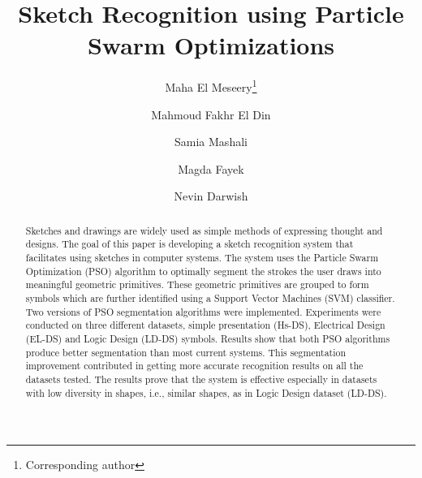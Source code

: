 \documentclass[preprint,10pt,5p,twocolumn]{elsarticle}
\begin{document}
\begin{frontmatter}
\title{Sketch Recognition using Particle Swarm Optimizations}


\author[ERI]{Maha El Meseery\footnote{Corresponding author}}
\author[ERI]{Mahmoud Fakhr El Din}
\author[ERI]{Samia Mashali}
\author[FAC]{Magda Fayek}
\author[FAC]{Nevin Darwish}
\address[ERI]{Signals Processing Group, Computers and Systems Department, 
  Electronic Research Institute, Cairo, Egypt\\melmeseery@eri.sci.eg, mafakhr@mcit.gov.eg, samia@eri.sci.eg}
\address[FAC]{Computer Engineering Department,
	Faculty of Engineering, Cairo University, Cairo, Egypt\\
	magdafayek@gmail.com, ndarwish@ieee.org}
\begin{abstract}
Sketches and drawings are widely used as simple methods of expressing thought and designs. The goal of this paper is developing a sketch recognition system that facilitates using sketches in computer systems. The system uses the Particle Swarm Optimization (PSO) algorithm to optimally segment the strokes the user draws into meaningful geometric primitives.  These geometric primitives are grouped to form symbols which are further identified using a Support Vector Machines (SVM) classifier. Two versions of PSO segmentation algorithms were implemented. Experiments were conducted on three different datasets, simple presentation (Hs-DS), Electrical Design (EL-DS) and Logic Design (LD-DS) symbols. Results show that both PSO algorithms produce better segmentation than most current systems. This segmentation improvement contributed in getting more accurate recognition results on all the datasets tested. The results prove that the system is effective especially in datasets with low diversity in shapes, i.e., similar shapes, as in Logic Design dataset (LD-DS). %


\end{abstract}
\end{frontmatter}
\end{document}
